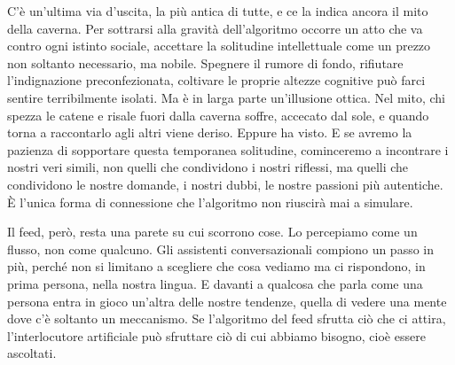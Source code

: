 C'è un'ultima via d'uscita, la più antica di tutte, e ce la indica ancora il mito della caverna. Per sottrarsi alla gravità dell'algoritmo occorre un atto che va contro ogni istinto sociale, accettare la solitudine intellettuale come un prezzo non soltanto necessario, ma nobile. Spegnere il rumore di fondo, rifiutare l'indignazione preconfezionata, coltivare le proprie altezze cognitive può farci sentire terribilmente isolati. Ma è in larga parte un'illusione ottica. Nel mito, chi spezza le catene e risale fuori dalla caverna soffre, accecato dal sole, e quando torna a raccontarlo agli altri viene deriso. Eppure ha visto. E se avremo la pazienza di sopportare questa temporanea solitudine, cominceremo a incontrare i nostri veri simili, non quelli che condividono i nostri riflessi, ma quelli che condividono le nostre domande, i nostri dubbi, le nostre passioni più autentiche. È l'unica forma di connessione che l'algoritmo non riuscirà mai a simulare.

Il feed, però, resta una parete su cui scorrono cose. Lo percepiamo come un flusso, non come qualcuno. Gli assistenti conversazionali compiono un passo in più, perché non si limitano a scegliere che cosa vediamo ma ci rispondono, in prima persona, nella nostra lingua. E davanti a qualcosa che parla come una persona entra in gioco un'altra delle nostre tendenze, quella di vedere una mente dove c'è soltanto un meccanismo. Se l'algoritmo del feed sfrutta ciò che ci attira, l'interlocutore artificiale può sfruttare ciò di cui abbiamo bisogno, cioè essere ascoltati.
